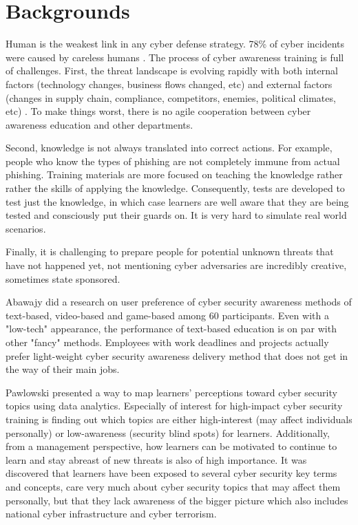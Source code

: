 \documentclass{article} %
\begin{document}
\section{Backgrounds}
Human is the weakest link in any cyber defense strategy. 78\% of cyber incidents were caused by careless humans \cite{20172017Overview}. The process of cyber awareness training is full of challenges. First, the threat landscape is evolving rapidly with both internal factors (technology changes, business flows changed, etc) and external factors (changes in supply chain, compliance, competitors, enemies, political climates, etc) \cite{Ingalsbe2008ThreatEnd, Manadhata2011AnMetric}. To make things worst, there is no agile cooperation between cyber awareness education and other departments. 

Second, knowledge is not always translated into correct actions. For example, people who know the types of phishing are not completely immune from actual phishing. Training materials are more focused on teaching the knowledge rather rather the skills of applying the knowledge. Consequently, tests are developed to test just the knowledge, in which case learners are well aware that they are being tested and consciously put their guards on. It is very hard to simulate real world scenarios.

Finally, it is challenging to prepare people for potential unknown threats that have not happened yet, not mentioning cyber adversaries are incredibly creative, sometimes state sponsored.

Abawajy \cite{Abawajy2014UserMethods} did a research on user preference of cyber security awareness methods of text-based, video-based and game-based among 60 participants. Even with a "low-tech" appearance, the performance of text-based education is on par with other "fancy" methods. Employees with work deadlines and projects actually prefer light-weight cyber security awareness delivery method that does not get in the way of their main jobs.

Pawlowski \cite{Pawlowski2016SocialDesign} presented a way to map learners' perceptions toward cyber security topics using data analytics.  Especially of interest for high-impact cyber security training is finding out which topics are either high-interest (may affect individuals personally) or low-awareness (security blind spots) for learners.  Additionally, from a management perspective, how learners can be motivated to continue to learn and stay abreast of new threats is also of high importance.  It was discovered that learners have been exposed to several cyber security key terms and concepts, care very much about cyber security topics that may affect them personally, but that they lack awareness of the bigger picture which also includes national cyber infrastructure and cyber terrorism.
\end{document}
